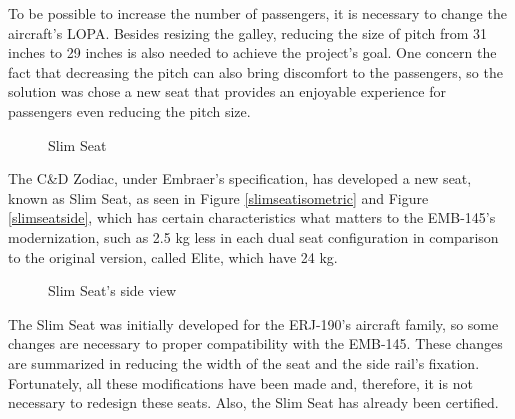 To be possible to increase the number of passengers, it is necessary to change the aircraft's LOPA. Besides resizing the galley, reducing the size of pitch from 31 inches to 29 inches is also needed to achieve the project's goal. One concern the fact that decreasing the pitch can also bring discomfort to the passengers, so the solution was chose a new seat that provides an enjoyable experience for passengers even reducing the pitch size.

\begin{figure}[H]
\caption{Slim Seat}
\label{fig:slimseatisometric}
\end{figure}

The C\&D Zodiac, under Embraer's specification, has developed a new seat, known as Slim Seat, as seen in Figure \ref{slimseatisometric} and Figure \ref{slimseatside}, which has certain characteristics what matters to the EMB-145's modernization, such as 2.5 kg less in each dual seat configuration in comparison to the original version, called Elite, which have 24 kg.

\begin{figure}[H]
\caption{Slim Seat's side view}
\label{fig:slimseatside}
\end{figure}

The Slim Seat was initially developed for the ERJ-190's aircraft family, so some changes are necessary to proper compatibility with the EMB-145. These changes are summarized in reducing the width of the seat and the side rail's fixation. Fortunately, all these modifications have been made and, therefore, it is not necessary to redesign these seats. Also, the Slim Seat has already been certified.
